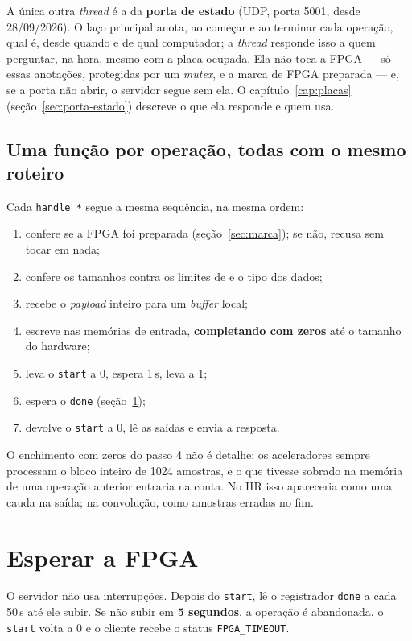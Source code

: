 A única outra \emph{thread} é a da \textbf{porta de estado} (UDP, porta 5001,
desde 28/09/2026). O laço principal anota, ao começar e ao terminar cada
operação, qual é, desde quando e de qual computador; a \emph{thread} responde
isso a quem perguntar, na hora, mesmo com a placa ocupada. Ela não toca a FPGA
--- só essas anotações, protegidas por um \emph{mutex}, e a marca de FPGA
preparada --- e, se a porta não abrir, o servidor segue sem ela. O
capítulo~\ref{cap:placas} (seção~\ref{sec:porta-estado}) descreve o que ela
responde e quem usa.

\subsection*{Uma função por operação, todas com o mesmo roteiro}

Cada \texttt{handle\_*} segue a mesma sequência, na mesma ordem:

\begin{enumerate}
  \item confere se a FPGA foi preparada (seção~\ref{sec:marca}); se não, recusa
    sem tocar em nada;
  \item confere os tamanhos contra os limites de  e o tipo
    dos dados;
  \item recebe o \emph{payload} inteiro para um \emph{buffer} local;
  \item escreve nas memórias de entrada, \textbf{completando com zeros} até o
    tamanho do hardware;
  \item leva o \texttt{start} a 0, espera 1\,\textmu s, leva a 1;
  \item espera o \texttt{done} (seção~\ref{sec:espera});
  \item devolve o \texttt{start} a 0, lê as saídas e envia a resposta.
\end{enumerate}

O enchimento com zeros do passo 4 não é detalhe: os aceleradores sempre
processam o bloco inteiro de 1024 amostras, e o que tivesse sobrado na memória
de uma operação anterior entraria na conta. No IIR isso apareceria como uma
cauda na saída; na convolução, como amostras erradas no fim.

\section{Esperar a FPGA}
\label{sec:espera}

O servidor não usa interrupções. Depois do \texttt{start}, lê o registrador
\texttt{done} a cada 50\,\textmu s até ele subir. Se não subir em
\textbf{5 segundos}, a operação é abandonada, o \texttt{start} volta a 0 e o
cliente recebe o status \texttt{FPGA\_TIMEOUT}.

